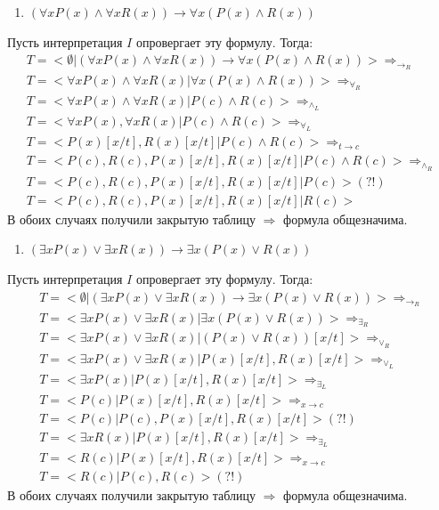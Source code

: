 \documentclass[11pt]{article}
\newcounter{th}\setcounter{th}{0}
\begin{document}
\begin{enumerate}
\item \((\forall x P(x) \land \forall x R(x)) \to \forall x(P(x) \land R(x))\)
\end{enumerate}

Пусть интерпретация \(I\) опровергает эту формулу. Тогда:
\begin{gather*}
T = <\emptyset | (\forall x P(x) \land \forall x R(x)) \to \forall x (P(x) \land R(x))> \Rightarrow_{\to_R} \\
T = <\forall x P(x) \land \forall x R(x) | \forall x (P(x) \land R(x))> \Rightarrow_{\forall_R} \\
T = <\forall x P(x) \land \forall x R(x) | P(c) \land R(c)> \Rightarrow_{\land_L} \\
T = <\forall x P(x), \forall x R(x) | P(c) \land R(c)> \Rightarrow_{\forall_L} \\
T = <P(x)[x/t], R(x)[x/t] | P(c) \land R(c)> \Rightarrow_{t\to c} \\
T = <P(c), R(c), P(x)[x/t], R(x)[x/t] | P(c) \land R(c)> \Rightarrow_{\land_R} \\
T = <P(c), R(c), P(x)[x/t], R(x)[x/t] | P(c)> (?!) \\
T = <P(c), R(c), P(x)[x/t], R(x)[x/t] | R(c)>
\end{gather*}
В обоих случаях получили закрытую таблицу $\Rightarrow$ формула общезначима.

\begin{enumerate}
\item \((\exists x P(x) \lor \exists x R(x)) \to \exists x (P(x) \lor R(x))\)
\end{enumerate}

Пусть интерпретация \(I\) опровергает эту формулу. Тогда:
\begin{gather*}
T = <\emptyset | (\exists x P(x) \lor \exists x R(x)) \to \exists x (P(x) \lor R(x))> \Rightarrow_{\to_R} \\
T = <\exists x P(x) \lor \exists x R(x) | \exists x (P(x) \lor R(x))> \Rightarrow_{\exists_R} \\
T = <\exists x P(x) \lor \exists x R(x) | (P(x) \lor R(x))[x/t]> \Rightarrow_{\lor_R} \\
T = <\exists x P(x) \lor \exists x R(x) | P(x)[x/t], R(x)[x/t]> \Rightarrow_{\lor_L} \\
T = <\exists x P(x) | P(x)[x/t], R(x)[x/t]> \Rightarrow_{\exists_L} \\
T = <P(c) | P(x)[x/t], R(x)[x/t]> \Rightarrow_{x \to c} \\
T = <P(c) | P(c), P(x)[x/t], R(x)[x/t]> (?!) \\
T = <\exists x R(x) | P(x)[x/t], R(x)[x/t]> \Rightarrow_{\exists_L} \\
T = <R(c) | P(x)[x/t], R(x)[x/t]> \Rightarrow_{x \to c} \\
T = <R(c) | P(c), R(c)> (?!)
\end{gather*}
В обоих случаях получили закрытую таблицу $\Rightarrow$ формула общезначима.
\end{document}
